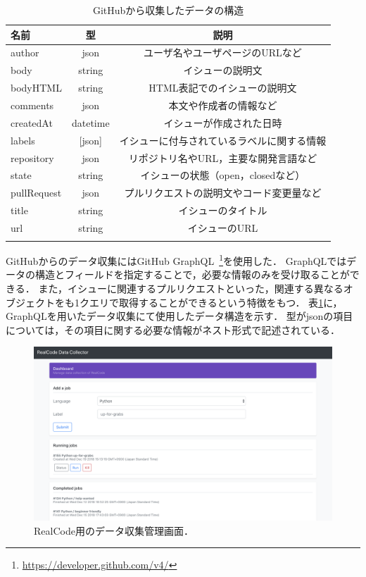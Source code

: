 \begin{table}[t]

  \centering
  \caption{GitHubから収集したデータの構造}
  \label{table:format_collected_GH_data}
    
  \begin{tabular}{l | c | c } \Xhline{3\arrayrulewidth}
      名前 & 型 & 説明 \\ \hline \hline
      author & json & ユーザ名やユーザページのURLなど\\
      body & string & イシューの説明文  \\
      bodyHTML & string & HTML表記でのイシューの説明文 \\
      comments & json & 本文や作成者の情報など \\
      createdAt & datetime & イシューが作成された日時 \\
      labels & [json] & イシューに付与されているラベルに関する情報 \\
      repository & json & リポジトリ名やURL，主要な開発言語など\\  
      state & string & イシューの状態（open，closedなど） \\
      pullRequest & json & プルリクエストの説明文やコード変更量など \\
      title & string & イシューのタイトル \\
      url & string & イシューのURL \\
      
      \Xhline{3\arrayrulewidth}
  \end{tabular}
\end{table}

GitHubからのデータ収集にはGitHub GraphQL~\footnote{\url{https://developer.github.com/v4/}}を使用した．
GraphQLではデータの構造とフィールドを指定することで，必要な情報のみを受け取ることができる．
また，イシューに関連するプルリクエストといった，関連する異なるオブジェクトをも1クエリで取得することができるという特徴をもつ．
表\ref{table:format_collected_GH_data}に，GraphQLを用いたデータ収集にて使用したデータ構造を示す．
型がjsonの項目については，その項目に関する必要な情報がネスト形式で記述されている．

\begin{figure}[t]
  \centering
  \includegraphics[width=1.0\columnwidth]{realcode-data-collector-screenshot.png}
  \caption{RealCode用のデータ収集管理画面．}
  \label{fig:realcode-data-collector}
\end{figure}

